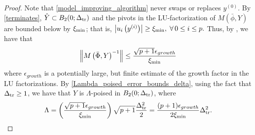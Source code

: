 \documentclass{article}
\begin{document}
\begin{proof}

Note that \cref{model_improving_algorithm} never swaps or replaces $y^{(0)}$.
By \cref{terminates},  $\hat Y \subset B_2(0;\Delta_{\textrm{tr}})$
and the pivots in the LU-factorization of $M(\bar{\phi},Y)$ are bounded below by $\xi_{\text{min}}$; that is,
$\left|u_i\left(y^{(i)}\right)\right| \ge \xi_{\text{min}}, \; \forall \,0 \le i \le p.$
Thus, by 
\cite[Section 6.7, Exercise 3]{introduction_book}, 
 we have that 
\begin{align*}
\left\|M\left(\bar \Phi, Y\right)^{-1}\right\| \le \frac{\sqrt{p+1}\epsilon_{growth}}{\xi_{\text{min}}}
\end{align*}
where $\epsilon_{growth}$ is a potentially large, but finite estimate of the growth factor in the LU factorizations.   By  \cref{Lambda_poised_error_bounds_delta},  using the fact that $\Delta_{\textrm{tr}} \ge 1$, we have that $Y$ is $\Lambda$-poised in $B_2(0;\Delta_{\textrm{tr}})$,  where
\[\Lambda = \left(\frac{\sqrt{p+1}\epsilon_{growth}}{\xi_{\text{min}}}\right) \sqrt{p+1}  \frac{\Delta_{\textrm{tr}}^2}{2} = \frac{(p+1) \epsilon_{growth}}{2\xi_{\text{min}}}\Delta_{\textrm{tr}}^2.\]
%
%
%
%
\end{proof}

%
%
\end{document}
